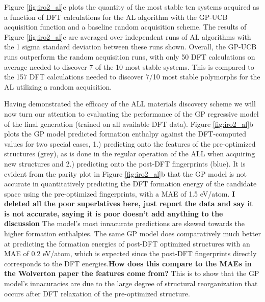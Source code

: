 %
Figure \ref{fig:iro2_al}e plots the quantity of the most stable ten systems acquired as a function of DFT calculations for the AL algorithm with the GP-UCB acquisition function and a baseline random acquisition scheme.
%
The results of Figure \ref{fig:iro2_al}e are averaged over independent runs of AL algorithms with the 1 sigma standard deviation between these runs shown.
%
Overall, the GP-UCB runs outperform the random acquisition runs, with only \num{50} DFT calculations on average needed to discover \num{7} of the \num{10} most stable systems.
%
This is compared to the \num{157} DFT calculations needed to discover \num{7/10} most stable polymorphs for the AL utilizing a random acquisition.


Having demonstrated the efficacy of the ALL materials discovery scheme we will now turn our attention to evaluating the performance of the GP regressive model of the final generation (trained on all available \IrOthree DFT data).
%
Figure \ref{fig:iro2_al}b plots the GP model predicted formation enthalpy against the DFT-computed values for two special cases,
1.) predicting onto the features of the pre-optimized structures (grey), as is done in the regular operation of the ALL when acquiring new structures and
2.) predicting onto the post-DFT fingerprints (blue).
%
It is evident from the parity plot in Figure \ref{fig:iro2_al}b that the GP model is not accurate in quantitatively predicting the DFT formation energy of the candidate space using the pre-optimized fingerprints,
with a MAE of \mytilde\num{1.5} eV/atom. \textbf{I deleted all the poor superlatives here, just report the data and say it is not accurate, saying it is poor doesn't add anything to the discussion}
%
The model's most innacurate predictions are skewed towards the higher formation enthalpies.
%
The same GP model does comparatively much better at predicting the formation energies of post-DFT optimized structures with an MAE of \mytilde\num{0.2} eV/atom,
which is expected since the post-DFT fingerprints directly corresponds to the DFT energies.\textbf{How does this compare to the MAEs in the Wolverton paper the features come from?}
%
This is to show that the GP model's innacuracies are due to the large degree of structural reorganization that occurs after DFT relaxation of the pre-optimized structure.
